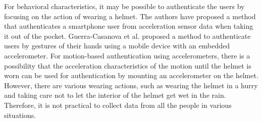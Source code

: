 \documentclass[sigchi,authordraft]{acmart}
\begin{document}



For behavioral characteristics, it may be possible to authenticate the users by focusing on the action of wearing a helmet. The authors have proposed a method that authenticates a smartphone user from acceleration sensor data when taking it out of the pocket\cite{murao_screen_unlock}. Guerra-Casanova et al.\cite{accelerometer_authentification} proposed a method to authenticate users by gestures of their hands using a mobile device with an embedded accelerometer. For motion-based authentication using accelerometers, there is a possibility that the acceleration characteristics of the motion until the helmet is worn can be used for authentication by mounting an accelerometer on the helmet. However, there are various wearing actions, such as wearing the helmet in a hurry and taking care not to let the interior of the helmet get wet in the rain. Therefore, it is not practical to collect data from all the people in various situations.\par

\end{document}
